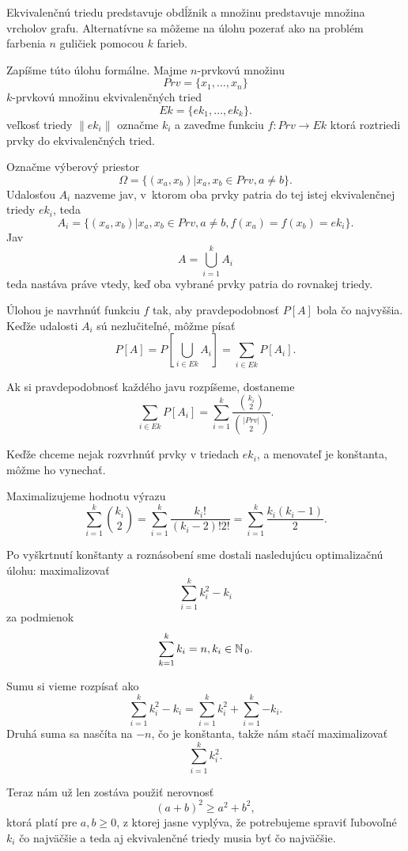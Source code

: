 \begin{note}
Ekvivalenčnú triedu predstavuje obdĺžnik a množinu predstavuje množina vrcholov grafu.
Alternatívne sa môžeme na úlohu pozerať ako na problém farbenia $n$ guličiek pomocou $k$ farieb.
\end{note}


Zapíšme túto úlohu formálne. Majme $n$-prvkovú množinu 
\[Prv = \{x_1,\ldots,x_n\}\] $k$-prvkovú množinu ekvivalenčných tried \[Ek = \{ek_1,\ldots, ek_k\}.\] veľkosť 
triedy $\|ek_i\|$ označme $k_i$ a zaveďme funkciu $f \colon Prv \to Ek$ ktorá roztriedi prvky do ekvivalenčných tried.

Označme výberový priestor \[\Omega = \{(x_a, x_b) | x_a, x_b \in Prv, a \not= b \}.\]
Udalosťou $A_i$ nazveme jav, v~ktorom oba prvky patria do tej istej ekvivalenčnej triedy $ek_i$,
teda \[A_i = \{(x_a, x_b) | x_a, x_b \in Prv, a \not= b, f(x_a) = f(x_b) = ek_i \}.\]
Jav \[A = \bigcup_{i=1}^{k} A_i\] teda nastáva práve vtedy,
 keď oba vybrané prvky patria do rovnakej triedy.

Úlohou je navrhnúť funkciu $f$ tak, aby pravdepodobnosť $P[A]$ bola čo najvyššia. 
Keďže udalosti $A_i$ sú nezlučiteľné, môžme písať 
\[P[A] = P[\bigcup_{i \in Ek} A_i] = \sum_{i \in Ek}P[A_i].\]

Ak si pravdepodobnosť každého javu rozpíšeme, dostaneme
\[\sum_{i \in Ek}P[A_i] = \sum_{i = 1}^{k} \frac{{{k_i} \choose {2}}}{{{|Prv|} \choose {2}}}.\] 



Keďže chceme nejak rozvrhnúť prvky v triedach $ek_i$, a menovateľ je konštanta, môžme ho vynechať.

Maximalizujeme hodnotu výrazu 
\[\sum_{i = 1}^{k} {{k_i} \choose {2}} = \sum_{i = 1}^{k} {\frac{k_i!}{(k_i -2 )!2!}} = \sum_{i = 1}^{k}{\frac{k_i (k_i-1)}{2}}.\]



Po vyškrtnutí konštanty a roznásobení sme dostali nasledujúcu optimalizačnú úlohu:
maximalizovať \[\sum_{i = 1}^{k} {k_i^2 - k_i}\] za podmienok \[\sum_{k=1}^{k}k_i = n,k_i \in \mathbb{N}\,_0.\]


Sumu si vieme rozpísať ako 
\[\sum_{i = 1}^{k} {k_i^2 - k_i} = \sum_{i = 1}^{k} {k_i^2} + \sum_{i = 1}^{k}{-k_i}.\]
Druhá suma sa nasčíta na $-n$, čo je konštanta, takže nám stačí maximalizovať 
\[\sum_{i = 1}^{k} {k_i^2}.\]

Teraz nám už len zostáva použiť nerovnosť
\[(a+b)^2 \geq a^2 + b^2,\] ktorá platí pre $a,b \geq 0$, z ktorej jasne vyplýva, že potrebujeme spraviť ľubovoľné $k_i$ čo najväčšie
a teda aj ekvivalenčné triedy musia byť čo najväčšie.

